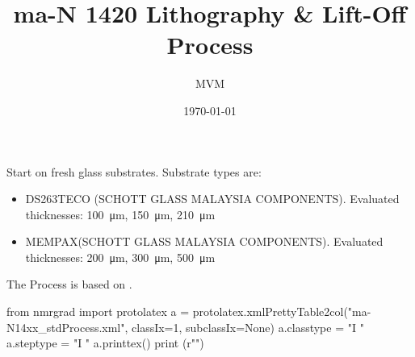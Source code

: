 \documentclass[12pt,a4paper,english,intoc,bibliography=totoc,BCOR=10mm,titlepage,fleqn]{scrartcl}
\title{ma-N 1420 Lithography \& Lift-Off Process}
\author{MVM}
\date{\today}
\begin{document}
\maketitle 

\def\noWaitSDR{Include nitrogen flush. No wait time after spin rinse dry.}
\def\rinseDIW{Gently rinse and shower wafers with \gls{DIW}.}
\def\rinseIPA{Rinse in \gls{IPA} after development.}

Start on fresh glass substrates. Substrate types are:

\begin{itemize}
\item DS263TECO (SCHOTT GLASS MALAYSIA COMPONENTS). Evaluated thicknesses: \SI{100}{\micro\metre}, \SI{150}{\micro\metre}, \SI{210}{\micro\metre}  
\item MEMPAX\textregistered (SCHOTT GLASS MALAYSIA COMPONENTS). Evaluated thicknesses: \SI{200}{\micro\metre}, \SI{300}{\micro\metre}, \SI{500}{\micro\metre}  
\end{itemize}

The Process is based on \cite{Vulto2005a, Muller2010}.
\\
\begin{pycode}
from nmrgrad import protolatex
a = protolatex.xmlPrettyTable2col("ma-N14xx_stdProcess.xml", classIx=1, subclassIx=None)
a.classtype = "I "
a.steptype  = "I "
a.printtex()
print (r"\vfill")
\end{pycode}
\begin{footnotesize}\printpythontex\end{footnotesize}



\end{document}
